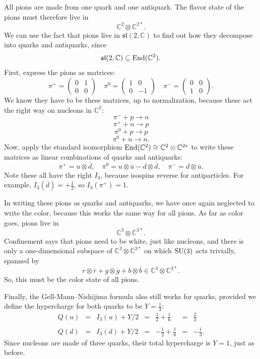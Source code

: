 \documentclass{article}
\newcommand{\C}{{\mathbb C}}  %
\newcommand{\SU}{{\rm SU}}    %
\newcommand{\End}{{\rm End}} %
\newcommand{\iso}{\cong} %
\newcommand{\half}{\frac{1}{2}} %
\newcommand{\third}{\frac{1}{3}} %
\newcommand{\twothirds}{\frac{2}{3}} %
\newcommand{\ubar}{\overline{u}} %
\newcommand{\dbar}{\overline{d}} %
\newcommand{\rbar}{{\overline{r}}} %
\newcommand{\gbar}{{\overline{g}}} %
\newcommand{\bbar}{{\overline{b}}} %
\begin{document}
All pions are made from one quark and one
antiquark.  The flavor state of the pions must therefore live in 
\[ \C^2 \otimes \C^{2*}. \]
We can use the fact that pions live in $\mathfrak{sl}(2, \C)$ to find out how
they decompose into quarks and antiquarks, since
\[ \mathfrak{sl}(2, \C) \subseteq \End(\C^2). \]
First, express the pions as matrices:
\[ 
\pi^+ = \left(\begin{array}{cc} 0 & 1 \\ 0 & 0 \end{array} \right) \quad  
\pi^0 = \left(\begin{array}{cc} 1 & 0 \\ 0 & -1 \end{array} \right) \quad
\pi^- = \left(\begin{array}{cc} 0 & 0 \\ 1 & 0 \end{array} \right) .\]
We know they have to be these matrices, up to normalization, because 
these act the right way on nucleons in $\C^2$:
\[	\pi^- + p \to n	\]
\[	\pi^+ + n \to p	\]
\[	\pi^0 + p \to p	\]
\[	\pi^0 + n \to n	.\]
Now, apply the standard isomorphism $\End (\C^2) \iso \C^2 \otimes \C^{2*}$ to
write these matrices as linear combinations of quarks and antiquarks:
\[ \pi^+ = u \otimes \dbar, \quad \pi^0 = u \otimes \ubar - d \otimes \dbar, \quad \pi^- = d \otimes \ubar .\]
Note these all have the right $I_3$, because isospins reverse for
antiparticles. For example, $I_3(\dbar) = +\half$, so $I_3(\pi^+) = 1$.

In writing these pions as quarks and antiquarks, we have once again neglected
to write the color, because this works the same way for all pions.  
As far as color goes, pions live in 
\[ \C^3 \otimes \C^{3*}. \]
Confinement says that pions need to be white, just like nucleons, and 
there is only a one-dimensional subspace of $\C^3 \otimes \C^{3*}$ on
which $\SU(3)$ acts trivially, spanned by
\[ r \otimes \rbar + 
g \otimes \gbar + b \otimes \bbar \in \C^3 \otimes \C^{3*} .\]
So, this must be the color state of all pions.

Finally, the Gell-Mann--Nishijima formula also still works for quarks, 
provided we define the hypercharge for both quarks to be $Y = \third$: 
\[
\begin{array}{ccccrcr}
	Q(u) &=& I_3(u) + Y/2 & = & \half + \frac{1}{6}  &=& \twothirds \\
                                                                        \\
	Q(d) &=& I_3(d) + Y/2 & = & -\half + \frac{1}{6} &=& -\third .  
\end{array}
\]
Since nucleons are made of three quarks, their total hypercharge is $Y = 1$,
just as before.
\end{document}
